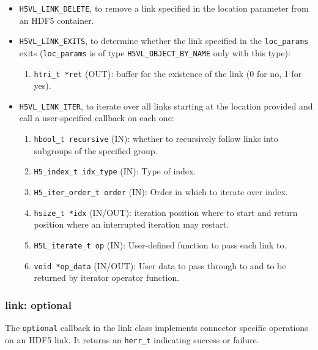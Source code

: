 \begin{itemize}
\item \texttt{H5VL\_LINK\_DELETE}, to remove a link specified in the location parameter from an HDF5 container.

\item \texttt{H5VL\_LINK\_EXITS}, to determine whether the link specified
  in the \texttt{loc\_params} exits (\texttt{loc\_params} is of type \texttt{H5VL\_OBJECT\_BY\_NAME} only with this type):
  \begin{enumerate}
  \item \texttt{htri\_t *ret} (OUT): buffer for the existence of the link
    (0 for no, 1 for yes).
  \end{enumerate}

\item \texttt{H5VL\_LINK\_ITER}, to iterate over all links starting at the location provided and call a user-specified callback on each one:
  \begin{enumerate}
  \item \texttt{hbool\_t recursive} (IN): whether to recursively follow links into subgroups of the specified group.\\
  \item \texttt{H5\_index\_t idx\_type} (IN): Type of index.\\
  \item \texttt{H5\_iter\_order\_t order} (IN): Order in which to iterate over index.\\
  \item \texttt{hsize\_t *idx} (IN/OUT):  iteration position where to start and return position where an interrupted iteration may restart.\\
  \item \texttt{H5L\_iterate\_t op} (IN): User-defined function to pass each link to. \\
  \item \texttt{void *op\_data} (IN/OUT): User data to pass through to and to be returned by iterator operator function. \\
  \end{enumerate}
\end{itemize}

\subsubsection{link: optional}
The \texttt{optional} callback in the link class implements connector specific operations on an HDF5 link. It returns an \texttt{herr\_t} indicating success or failure.\bigskip 

